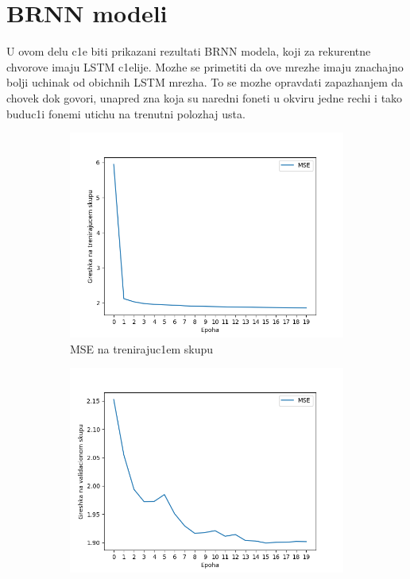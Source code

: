 \documentclass[a4paper, openany, oneside, 11pt]{book}
\begin{document}
\section[$BRNN$ modeli]{$\mathbf{BRNN}$ modeli}
U ovom delu c1e biti prikazani rezultati \acrshort{BRNN} modela, koji za rekurentne chvorove imaju \acrshort{LSTM} c1elije. Mozhe se primetiti da ove mrezhe imaju znachajno bolji uchinak od obichnih \acrshort{LSTM} mrezha. To se mozhe opravdati zapazhanjem da chovek dok govori, unapred zna koja su naredni foneti u okviru jedne rechi i tako buduc1i fonemi utichu na trenutni polozhaj usta. 
\newpage
\begin{figure}[!h]
        \centering
        \begin{subfigure}{0.475\textwidth}
            \centering
            \includegraphics[scale=0.45]{res/SL_BLSTM_30units_d00_train.png}
            \caption{\acrshort{MSE} na trenirajuc1em skupu}
            \label{fig:4_6a}
            \vspace{0pt}
        \end{subfigure}%
        \begin{subfigure}{0.475\textwidth}
            \centering
            \includegraphics[scale=0.45]{res/SL_BLSTM_30units_d00_validation.png}

\end{subfigure}
\end{figure}
\end{document}
